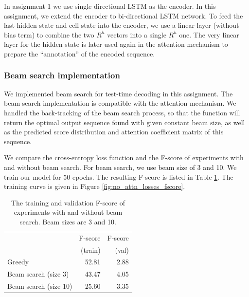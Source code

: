 \documentclass[11pt,a4paper]{article}
\begin{document}
	In assignment 1 we use single directional LSTM as the encoder. In this assignment, we extend the encoder to bi-directional LSTM network. To feed the last hidden state and cell state into the encoder, we use a linear layer (without bias term) to combine the two $R^h$ vectors into a single $R^h$ one. The very linear layer for the hidden state is later used again in the attention mechanism to prepare the ``annotation'' of the encoded sequence.

\subsubsection{Beam search implementation}

	We implemented beam search for test-time decoding in this assignment. The beam search implementation is compatible with the attention mechanism. We handled the back-tracking of the beam search process, so that the function will return the optimal output sequence found with given constant beam size, as well as the predicted score distribution and attention coefficient matrix of this sequence.
    
    We compare the cross-entropy loss function and the F-score of experiments with and without beam search. For beam search, we use beam size of 3 and 10. We train our model for 50 epochs. The resulting F-score is listed in Table \ref{tab:beam}. The training curve is given in Figure \ref{fig:no_attn_losses_fscore}.


\begin{table}[ht]
\centering
\caption{The training and validation F-score of experiments with and without beam search. Beam sizes are 3 and 10.}
\label{tab:beam}
\begin{tabular}{lrr}
\toprule
                  & F-score  & F-score    \\
                  & (train)  & (val)    \\ \midrule
Greedy            & 52.81            & 2.88                    \\
Beam search (size 3)   & 43.47            & 4.05                    \\
Beam search (size 10)  & 25.60            & 3.35                    \\ \bottomrule
\end{tabular}
\end{table}
\end{document}
